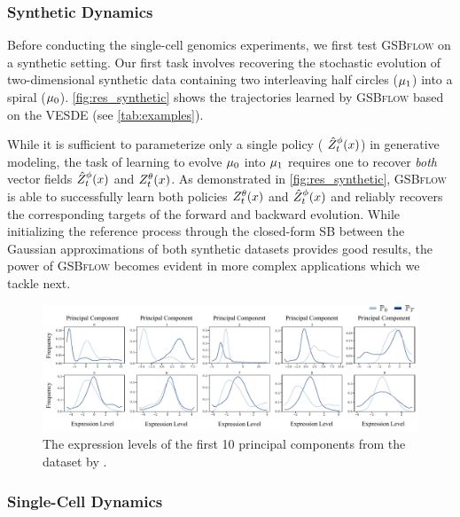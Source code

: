 \subsubsection{Synthetic Dynamics} 
\label{sec:gsbflow_synthetic}

Before conducting the single-cell genomics experiments, we first test \textsc{GSBflow} on a synthetic setting. 
Our first task involves recovering the stochastic evolution of two-dimensional synthetic data containing two interleaving half circles ($\mu_1$) into a spiral ($\mu_0$). 
\cref{fig:res_synthetic} shows the trajectories learned by \textsc{GSBflow} based on the \acrshort{VESDE} (see \cref{tab:examples}). 


While it is sufficient to parameterize only a single policy ({\color{blue} $\SBb$}) in generative modeling, the task of learning to evolve $\mu_0$ into $\mu_1$ requires one to recover \emph{both} vector fields {\color{blue} $\SBb$} and {\color{pink} $\SBf$}.
As demonstrated in \cref{fig:res_synthetic}, \textsc{GSBflow} is able to successfully learn both policies {\color{pink} $\SBf$} and {\color{blue} $\SBb$} and reliably recovers the corresponding targets of the forward and backward evolution. While initializing the reference process through the closed-form SB between the Gaussian approximations of both synthetic datasets provides good results, the power of \textsc{GSBflow} becomes evident in more complex applications which we tackle next.

\begin{figure}
     \centering
         \centering
         \includegraphics[width=\textwidth]{figures/fig_marginals_schiebinger_pcs_cropped.pdf}
         \caption{The expression levels of the first 10 principal components from the dataset by \citet{schiebinger2019optimal}.}
\label{fig:gaussianMain}
\end{figure}

\subsubsection{Single-Cell Dynamics}
\label{sec:gsbflow_cell}

